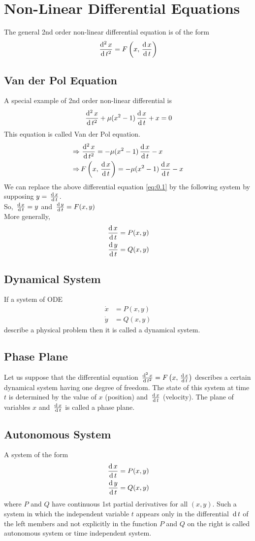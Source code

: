 \documentclass[../main-sheet.tex]{subfiles}
\begin{document}
\chapter{Non-Linear Differential Equations}
The general 2nd order non-linear differential equation is of the form
\begin{equation}
    \,\frac{\mathrm{d}^{2}\,x}{\mathrm{d}\,t^{2}}=F\left( x,\,\frac{\mathrm{d}\,x}{\mathrm{d}\,t} \right)\label{eq:0.1}
\end{equation}
\section{Van der Pol Equation}
A special example of 2nd order non-linear differential is
\begin{equation}
    \,\frac{\mathrm{d}^{2}\,x}{\mathrm{d}\,t^{2}}+\mu(x^2-1)\,\frac{\mathrm{d}\,x}{\mathrm{d}\,t}+x=0\label{eq:0.2}
\end{equation}
This equation is called Van der Pol equation.
\begin{align*}
    \Rightarrow\,&\,\frac{\mathrm{d}^{2}\,x}{\mathrm{d}\,t^{2}}=-\mu(x^2-1)\,\frac{\mathrm{d}\,x}{\mathrm{d}\,t}-x\\
    \Rightarrow\,&F\left( x,\,\frac{\mathrm{d}\,x}{\mathrm{d}\,t} \right)=-\mu(x^2-1)\,\frac{\mathrm{d}\,x}{\mathrm{d}\,t}-x
\end{align*}
We can replace the above differential equation \eqref{eq:0.1} by the following system by supposing \(y=\,\frac{\mathrm{d}\,x}{\mathrm{d}\,t}\).\\
So, \(\,\frac{\mathrm{d}\,x}{\mathrm{d}\,t}=y\) and \(\,\frac{\mathrm{d}\,y}{\mathrm{d}\,t}=F(x,y)\)\\
More generally,
\begin{align*}
    \,\frac{\mathrm{d}\,x}{\mathrm{d}\,t}&=P(x,y)\\
    \,\frac{\mathrm{d}\,y}{\mathrm{d}\,t}&=Q(x,y)
\end{align*}
\section{Dynamical System}
If a system of ODE
\begin{align*}
    \dot{x}&=P(x,y)\\
    \dot{y}&=Q(x,y)
\end{align*}
describe a physical problem then it is called a dynamical system.
\section{Phase Plane}
Let us suppose that the differential equation \(\,\frac{\mathrm{d}^{2}\,x}{\mathrm{d}\,t^{2}}=F\left( x,\,\frac{\mathrm{d}\,x}{\mathrm{d}\,t} \right)\) describes a certain dynamical system having one degree of freedom. The state of this system at time \(t\) is determined by the value of \(x\) (position) and \(\,\frac{\mathrm{d}\,x}{\mathrm{d}\,t}\) (velocity). The plane of variables \(x\) and \(\,\frac{\mathrm{d}\,x}{\mathrm{d}\,t}\) is called a phase plane.
\section{Autonomous System}
A system of the form
\begin{align*}
    \,\frac{\mathrm{d}\,x}{\mathrm{d}\,t}&=P(x,y)\\
    \,\frac{\mathrm{d}\,y}{\mathrm{d}\,t}&=Q(x,y)
\end{align*}
where \(P\) and \(Q\) have continuous 1st partial derivatives for all \((x,y)\). Such a system in which the independent variable \(t\) appears only in the differential \(\,\mathrm{d}\, t\) of the left members and not explicitly in the function \(P\) and \(Q\) on the right is called autonomous system or time independent system.
\end{document}
